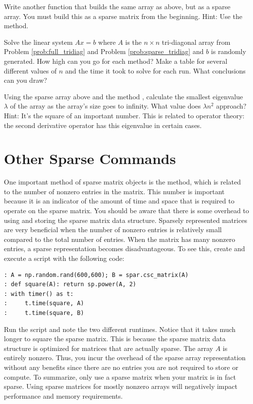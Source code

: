 \begin{problem}
Write another function that builds the same array as above, but as a sparse array. 
You must build this as a sparse matrix from the beginning. 
Hint: Use the  method.
\label{prob:sparse_tridiag}
\end{problem}

\begin{problem}
Solve the linear system $Ax = b$ where $A$ is the $n\times n$
tri-diagonal array from Problem \ref{prob:full_tridiag} and Problem \ref{prob:sparse_tridiag} and $b$ is randomly
generated.  How high can you go for each method?  Make a table for
several different values of $n$ and the time it took to solve for
each run.  What conclusions can you draw?
\end{problem}

\begin{problem}
Using the sparse array above and the method , 
calculate the smallest eigenvalue $\lambda$ of the array as the array's size goes to infinity. 
What value does $\lambda n^2$ approach?  
Hint: It's the square of an important number. 
This is related to operator theory: the second derivative operator has this eigenvalue in certain cases.
\end{problem}

\section*{Other Sparse Commands}
One important method of sparse matrix objects is the  method, 
which is related to the number of nonzero entries in the matrix.  
This number is important because it is an indicator of the amount of time and space
that is required to operate on the sparse matrix. 
You should be aware that there is some overhead to using and storing the sparse matrix data structure. 
Sparsely represented matrices are very beneficial when the number of 
nonzero entries is relatively small compared to the total number of entries. 
When the matrix has many nonzero entries, a sparse representation becomes disadvantageous. 
To see this, create and execute a script with the following code:
\begin{lstlisting}
: A = np.random.rand(600,600); B = spar.csc_matrix(A)
: def square(A): return sp.power(A, 2)
: with timer() as t:
:     t.time(square, A)
:     t.time(square, B)
\end{lstlisting}
Run the script and note the two different runtimes. 
Notice that it takes much longer to square the sparse matrix.
This is because the sparse matrix data structure is optimized for matrices that are actually sparse.
The array $A$ is entirely nonzero. 
Thus, you incur the overhead of the sparse array representation without any 
benefits since there are no entries you are not required to store or compute.
To summarize, only use a sparse matrix when your matrix is in fact sparse. 
Using sparse matrices for mostly nonzero arrays will negatively impact performance and memory requirements.

